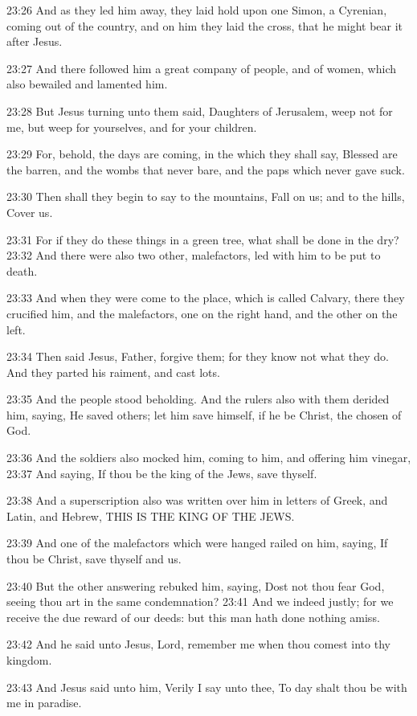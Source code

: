 23:26 And as they led him away, they laid hold upon one Simon, a
Cyrenian, coming out of the country, and on him they laid the cross,
that he might bear it after Jesus.

23:27 And there followed him a great company of people, and of women,
which also bewailed and lamented him.

23:28 But Jesus turning unto them said, Daughters of Jerusalem, weep
not for me, but weep for yourselves, and for your children.

23:29 For, behold, the days are coming, in the which they shall say,
Blessed are the barren, and the wombs that never bare, and the paps
which never gave suck.

23:30 Then shall they begin to say to the mountains, Fall on us; and
to the hills, Cover us.

23:31 For if they do these things in a green tree, what shall be done
in the dry?  23:32 And there were also two other, malefactors, led
with him to be put to death.

23:33 And when they were come to the place, which is called Calvary,
there they crucified him, and the malefactors, one on the right hand,
and the other on the left.

23:34 Then said Jesus, Father, forgive them; for they know not what
they do. And they parted his raiment, and cast lots.

23:35 And the people stood beholding. And the rulers also with them
derided him, saying, He saved others; let him save himself, if he be
Christ, the chosen of God.

23:36 And the soldiers also mocked him, coming to him, and offering
him vinegar, 23:37 And saying, If thou be the king of the Jews, save
thyself.

23:38 And a superscription also was written over him in letters of
Greek, and Latin, and Hebrew, THIS IS THE KING OF THE JEWS.

23:39 And one of the malefactors which were hanged railed on him,
saying, If thou be Christ, save thyself and us.

23:40 But the other answering rebuked him, saying, Dost not thou fear
God, seeing thou art in the same condemnation?  23:41 And we indeed
justly; for we receive the due reward of our deeds: but this man hath
done nothing amiss.

23:42 And he said unto Jesus, Lord, remember me when thou comest into
thy kingdom.

23:43 And Jesus said unto him, Verily I say unto thee, To day shalt
thou be with me in paradise.

